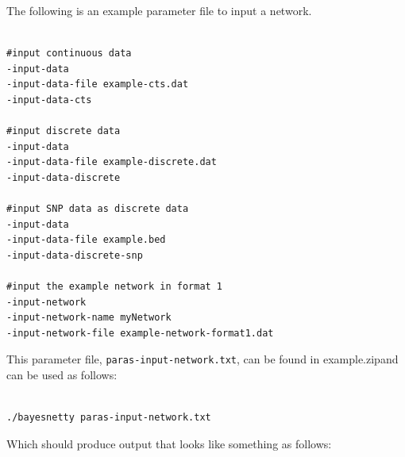 \documentclass[a4paper,12pt]{article}
\newcommand{\code}[1]{{\footnotesize{{\tt #1}}}}
\begin{document}
The following is an example parameter file to input a network. 
\vspace{0.35cm} \begin{lstlisting}

#input continuous data
-input-data
-input-data-file example-cts.dat
-input-data-cts

#input discrete data
-input-data
-input-data-file example-discrete.dat
-input-data-discrete

#input SNP data as discrete data
-input-data
-input-data-file example.bed
-input-data-discrete-snp

#input the example network in format 1
-input-network
-input-network-name myNetwork
-input-network-file example-network-format1.dat

\end{lstlisting} \vspace{0.35cm}
This parameter file, \code{paras-input-network.txt}, can be found in example.zipand can be used as follows: 
\vspace{0.35cm} \begin{lstlisting}

./bayesnetty paras-input-network.txt

\end{lstlisting} \vspace{0.35cm}
Which should produce output that looks like something as follows: 
\end{document}
